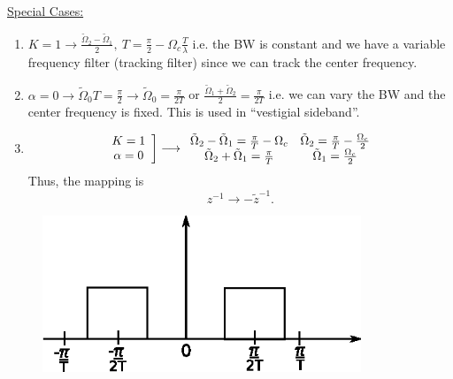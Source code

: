 \documentclass [12pt]{article}   %
\begin{document}
\begin{enumerate}
	\medskip
	\underline{Special Cases:}
	
	\medskip
	\begin{enumerate}
		\item $K = 1 \longrightarrow \frac{\tilde{\Omega}_2-\tilde{\Omega}_1}{2},~T=\frac{\pi}{2}-\Omega_c \frac{T}{\lambda}$ i.e. the BW is constant and we have a variable frequency filter (tracking filter) since we can track the center frequency.
		\item $\alpha = 0 \longrightarrow \tilde{\Omega}_0T = \frac{\pi}{2} \longrightarrow \tilde{\Omega}_0 = \frac{\pi}{2T}$ or $\frac{\tilde{\Omega}_1 + \tilde{\Omega}_2}{2}=\frac{\pi}{2T}$ i.e. we can vary the BW and the center frequency is fixed. This is used in ``vestigial sideband''.
		\item \begin{equation}
		\left.\begin{array}{c} K = 1 \\ \alpha = 0 \end{array}\right]\longrightarrow \begin{array}{c c} \tilde{\Omega}_2 - \tilde{\Omega}_1 = \frac{\pi}{T} - \Omega_c & \tilde{\Omega}_2 = \frac{\pi}{T} - \frac{\Omega_c}{2} \\ \tilde{\Omega}_2 + \tilde{\Omega}_1 = \frac{\pi}{T} & \tilde{\Omega}_1 = \frac{\Omega_c}{2} \end{array}\end{equation}
		Thus, the mapping is
		\begin{equation}
			z^{-1} \longrightarrow -\tilde{z}^{-1}.
		\end{equation}
	\end{enumerate}
\end{enumerate}
\begin{figure}[H]
	\centering
	\includegraphics[width=3.75in]{LPFBPFmap2.eps}
	\label{fig:transformation32}
\end{figure}
\end{document}
